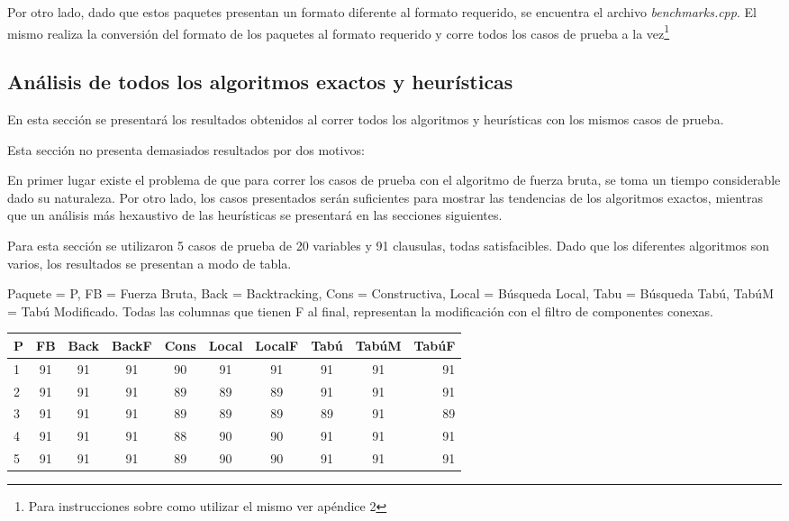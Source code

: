 \documentclass[a4paper,10pt]{article}
\begin{document}
Por otro lado, dado que estos paquetes presentan un formato diferente al formato requerido, se encuentra el archivo \emph{benchmarks.cpp}. El mismo realiza la conversi\'on del formato de los paquetes al formato requerido y corre todos los casos de prueba a la vez\footnote{Para instrucciones sobre como utilizar el mismo ver ap\'endice 2}

\subsection*{An\'alisis de todos los algoritmos exactos y heur\'isticas}

En esta secci\'on se presentar\'a los resultados obtenidos al correr todos los algoritmos y heur\'isticas con los mismos casos de prueba. 

Esta secci\'on no presenta demasiados resultados por dos motivos:

En primer lugar existe el problema de que para correr los casos de prueba con el algoritmo de fuerza bruta, se toma un tiempo considerable dado su naturaleza. Por otro lado, los casos presentados ser\'an suficientes para mostrar las tendencias de los algoritmos exactos, mientras que un an\'alisis m\'as hexaustivo de las heur\'isticas se presentar\'a en las secciones siguientes.

\medskip

Para esta secci\'on se utilizaron 5 casos de prueba de 20 variables y 91 clausulas, todas satisfacibles. Dado que los diferentes algoritmos son varios, los resultados se presentan a modo de tabla.
\medskip

Paquete = P, FB = Fuerza Bruta, Back = Backtracking, Cons = Constructiva, Local = B\'usqueda Local, Tabu = B\'usqueda Tab\'u, Tab\'uM = Tab\'u Modificado. Todas las columnas que tienen F al final, representan la modificaci\'on con el filtro de componentes conexas.

\medskip


\begin{tabular}{||l|c|c|c|c|c|c|c|c|r||}
\hline
\hline
P & FB & Back & BackF & Cons & Local & LocalF & Tab\'u & Tab\'uM & Tab\'uF\\
\hline
1 & 91 & 91 & 91 & 90 & 91 & 91 & 91 & 91 & 91\\
\hline
2 & 91 & 91 & 91 & 89 & 89 & 89 & 91 & 91 & 91\\
\hline
3 & 91 & 91 & 91 & 89 & 89 & 89 & 89 & 91 & 89\\
\hline
4 & 91 & 91 & 91 & 88 & 90 & 90 & 91 & 91 & 91\\
\hline
5 & 91 & 91 & 91 & 89 & 90 & 90 & 91 & 91 & 91\\
\hline
\hline
\end{tabular}
\end{document}
